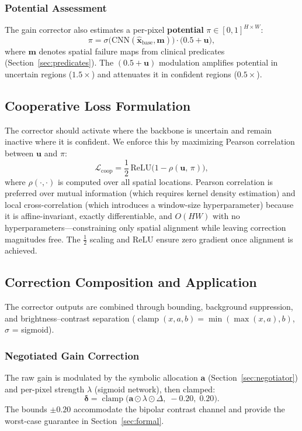 \documentclass[journal,twoside,web]{ieeecolor}
\begin{document}
\subsubsection{Potential Assessment}
The gain corrector also estimates a per-pixel \textbf{potential} $\pi \in [0,1]^{H \times W}$:
\begin{equation}
\pi = \sigma\!\big(\text{CNN}(\hat{\mathbf{x}}_\text{base}, \mathbf{m})\big) \cdot \big(0.5 + \mathbf{u}\big),
\label{eq:potential}
\end{equation}
where $\mathbf{m}$ denotes spatial failure maps from clinical predicates (Section~\ref{sec:predicates}). The $(0.5 + \mathbf{u})$ modulation amplifies potential in uncertain regions ($1.5{\times}$) and attenuates it in confident regions ($0.5{\times}$).

\subsection{Cooperative Loss Formulation}
\label{sec:coop_loss}
The corrector should activate where the backbone is uncertain and remain inactive where it is confident. We enforce this by maximizing Pearson correlation between $\mathbf{u}$ and $\pi$:
\begin{equation}
\mathcal{L}_\text{coop} = \frac{1}{2}\,\text{ReLU}\!\big(1 - \rho(\mathbf{u},\, \pi)\big),
\label{eq:coop_loss}
\end{equation}
where $\rho(\cdot,\cdot)$ is computed over all spatial locations. Pearson correlation is preferred over mutual information (which requires kernel density estimation) and local cross-correlation (which introduces a window-size hyperparameter) because it is affine-invariant, exactly differentiable, and $O(HW)$ with no hyperparameters---constraining only spatial alignment while leaving correction magnitudes free. The $\frac{1}{2}$ scaling and ReLU ensure zero gradient once alignment is achieved.

\subsection{Correction Composition and Application}
\label{sec:correction_composition}
The corrector outputs are combined through bounding, background suppression, and brightness--contrast separation ($\operatorname{clamp}(x, a, b) = \min(\max(x, a), b)$, $\sigma$ = sigmoid).

\subsubsection{Negotiated Gain Correction}
The raw gain is modulated by the symbolic allocation $\mathbf{a}$ (Section~\ref{sec:negotiator}) and per-pixel strength $\lambda$ (sigmoid network), then clamped:
\begin{equation}
\boldsymbol{\delta} = \operatorname{clamp}\!\Big(\mathbf{a} \odot \lambda \odot \Delta,\; -0.20,\; 0.20\Big).
\label{eq:composition}
\end{equation}
The bounds $\pm 0.20$ accommodate the bipolar contrast channel and provide the worst-case guarantee in Section~\ref{sec:formal}.
\end{document}
